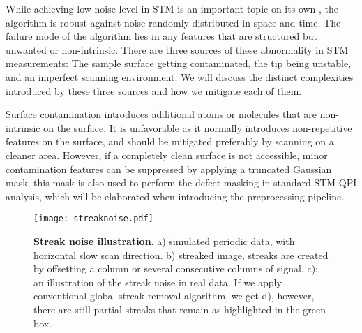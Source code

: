 While achieving low noise level in \ac{STM} is an important topic on its own \cite{geAchievingLowNoise2019}, the algorithm is robust against noise randomly distributed in space and time. The failure mode of the algorithm lies in any features that are structured but unwanted or non-intrinsic. There are three sources of these abnormality in \ac{STM} measurements: The sample surface getting contaminated, the tip being unstable, and an imperfect scanning environment. We will discuss the distinct complexities introduced by these three sources and how we mitigate each of them.  

Surface contamination introduces additional atoms or molecules that are non-intrinsic on the surface. It is unfavorable as it normally introduces non-repetitive features on the surface, and should be mitigated preferably by scanning on a cleaner area. However, if a completely clean surface is not accessible, minor contamination features can be suppressed by applying a truncated Gaussian mask; this mask is also used to perform the defect masking in standard STM-QPI analysis, which will be elaborated when introducing the preprocessing pipeline.

\begin{figure}
	\texttt{[image: streaknoise.pdf]} 
	\centering
	\caption[\textbf{Streak noise illustration}]{\textbf{Streak noise illustration}. a) simulated periodic data, with horizontal slow scan direction. b) streaked image, streaks are created by offsetting a column or several consecutive columns of signal. c): an illustration of the streak noise in real data. If we apply conventional global streak removal algorithm, we get d), however, there are still partial streaks that remain as highlighted in the green box.}
	\label{fig:streaks}
\end{figure}

